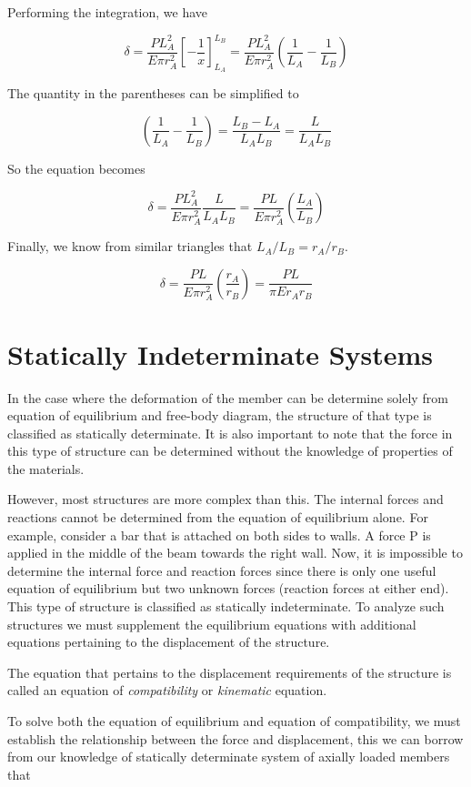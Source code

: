 \documentclass[
10pt,
a4paper,
openany,
svgnames,
]{kaobook} %
\begin{document}
\begin{solution}
Performing the integration, we have

\[\delta  = \frac{PL_A^2}{E\pi r_A^2}\left[ - \frac{1}{x} \right]_{L_A}^{L_B} = \frac{PL_A^2}{E\pi r_A^2}\left( \frac{1}{L_A} - \frac{1}{L_B} \right)\]	

The quantity in the parentheses can be simplified to

\[\left( \frac{1}{L_A} - \frac{1}{L_B} \right) = \frac{L_B - L_A}{L_AL_B} = \frac{L}{L_AL_B}\]	

So the equation becomes

\[\delta  = \frac{PL_A^2}{E\pi r_A^2}\frac{L}{L_AL_B} = \frac{PL}{E\pi r_A^2}\left( \frac{L_A}{L_B} \right)\]	

Finally, we know from similar triangles that $L_A/L_B = r_A/r_B$.

\[\delta  = \frac{PL}{E\pi r_A^2}\left( \frac{r_A}{r_B} \right) = \frac{PL}{\pi Er_Ar_B}\]

\end{solution}

\section{Statically Indeterminate Systems}

In the case where the deformation of the member can be determine solely from equation of equilibrium and free-body diagram, the structure of that type is classified as statically determinate. It is also important to note that the force in this type of structure can be determined without the knowledge of properties of the materials.

However, most structures are more complex than this. The internal forces and reactions cannot be determined from the equation of equilibrium alone. For example, consider a bar that is attached on both sides to walls. A force P is applied in the middle of the beam towards the right wall. Now, it is impossible to determine the internal force and reaction forces since there is only one useful equation of equilibrium but two unknown forces (reaction forces at either end). This type of structure is classified as statically indeterminate. To analyze such structures we must supplement the equilibrium equations with additional equations pertaining to the displacement of the structure.

The equation that pertains to the displacement requirements of the structure is called an equation of \emph{compatibility} or \emph{kinematic} equation.

To solve both the equation of equilibrium and equation of compatibility, we must establish the relationship between the force and displacement, this we can borrow from our knowledge of statically determinate system of axially loaded members that
	
\end{document}
